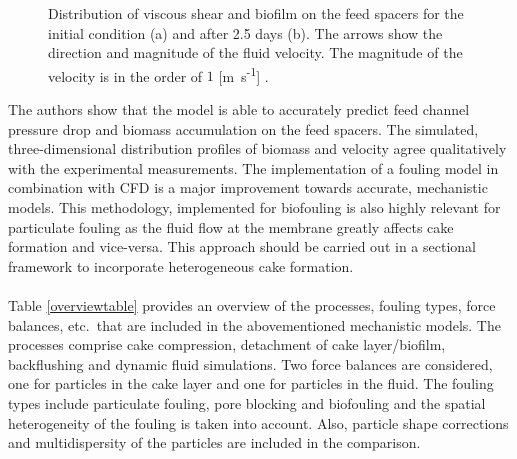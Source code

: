 \begin{figure}[]
    \centerline{
    }
    \caption{Distribution of viscous shear and biofilm on the feed spacers for the initial condition (a) and after 2.5 days (b). The arrows show the direction and magnitude of the fluid velocity. The magnitude of the velocity is in the order of $1$ [m\, s\textsuperscript{-1}] \citep{Picioreanu2009}.   \label{picioPic}}
\end{figure}

The authors show that the model is able to accurately predict feed channel pressure drop and  biomass accumulation on the feed spacers. The simulated, three-dimensional distribution profiles of biomass and velocity agree qualitatively with the experimental measurements. The implementation of a fouling model in combination with \gls{CFD} is a major improvement towards accurate, mechanistic models. This methodology, implemented for biofouling is also highly relevant for particulate fouling as the fluid flow at the membrane greatly affects cake formation and vice-versa. This approach should be carried out in a sectional framework to incorporate heterogeneous cake formation. \\ \\
Table \ref{overviewtable} provides an overview of the processes, fouling types, force balances, etc.\ that are included in the abovementioned mechanistic models. The processes comprise cake compression, detachment of cake layer/biofilm, backflushing and dynamic fluid simulations. Two force balances are considered, one for particles in the cake layer and one for particles in the fluid. The fouling types include particulate fouling, pore blocking and biofouling and the spatial heterogeneity of the fouling is taken into account. Also, particle shape corrections and multidispersity of the particles are included in the comparison.     





